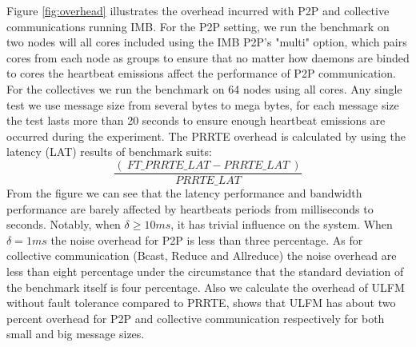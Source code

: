 \documentclass[sigconf]{acmart}
\newcommand{\prrte}[0]{\textsc{PRRTE}\xspace}
\newcommand{\ulfm}[0]{\textsc{ULFM}\xspace}
\newcommand{\imb}[0]{\textsc{IMB}\xspace}
\begin{document}
Figure \ref{fig:overhead} illustrates the overhead incurred with P2P and collective communications running \imb. 
For the P2P setting, we run the benchmark on two nodes will all cores included using the \imb P2P's "multi" option, which pairs cores from each node as groups to ensure that no matter how daemons are binded to cores the heartbeat emissions affect the performance of P2P communication. For the collectives we run the benchmark on 64 nodes using all cores. Any single test we use message size from several bytes to mega bytes, for each message size the test lasts more than 20 seconds to ensure enough heartbeat emissions are occurred during the experiment. The \prrte overhead is calculated by using the latency (LAT) results of benchmark suits: 
\begin{equation}
\frac{(\ {FT\_PRRTE\_LAT - PRRTE\_LAT}\ )}{PRRTE\_LAT} 
\end{equation}
 From the figure we can see that the latency performance and bandwidth performance are barely affected by heartbeats periods from milliseconds to seconds. Notably, when $ \delta \geq 10 ms $, it has trivial influence on the system. When  $ \delta = 1 ms $ the noise overhead for P2P is less than three percentage. As for collective communication (Bcast, Reduce and Allreduce) the noise overhead are less than eight percentage under the circumstance that the standard deviation of the benchmark itself is four percentage. Also we calculate the overhead of \ulfm without fault tolerance compared to \prrte, shows that \ulfm has about two percent overhead for P2P and collective communication respectively for both small and big message sizes.
\end{document}

